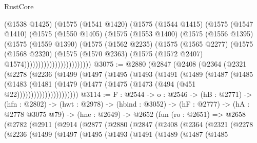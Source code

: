\begin{lexlean}{RustCore}
\begin{coremodule}
                            (@1538 @1425)
                            (@1575
                              (@1541 @1420)
                              (@1575
                                (@1544 @1415)
                                (@1575
                                  (@1547 @1410)
                                  (@1575
                                    (@1550 @1405)
                                    (@1575
                                      (@1553 @1400)
                                      (@1575
                                        (@1556 @1395)
                                        (@1575
                                          (@1559 @1390)
                                          (@1575
                                            (@1562 @2235)
                                            (@1575
                                              (@1565 @2277)
                                              (@1575
                                                (@1568 @2320)
                                                (@1575
                                                  (@1570 @2363)
                                                  (@1575 (@1572 @2407) @1574))))))))))))))))))))))))
@3075 := @2880
    (@2847
      (@2408
        (@2364
          (@2321
            (@2278
              (@2236
                (@1499
                  (@1497
                    (@1495
                      (@1493
                        (@1491
                          (@1489
                            (@1487
                              (@1485
                                (@1483
                                  (@1481
                                    (@1479
                                      (@1477 (@1475 (@1473 (@494 (@451 @22))))))))))))))))))))))
@3114 := {F : @2544} ->
  {o : @2546} ->
  (hB : @2771) ->
  (hfn : @2802) ->
  (hwt : @2978) ->
  (hbind : @3052) ->
  (hF : @2777) ->
  (hA : @2778 @3075 @79) ->
  (hne : @2649) ->
  @2652
    (fun (ro : @2651) =>
    @2658
      (@2782
        (@2911
          (@2914
            (@2877
              (@2880
                (@2847
                  (@2408
                    (@2364
                      (@2321
                        (@2278
                          (@2236
                            (@1499
                              (@1497
                                (@1495
                                  (@1493
                                    (@1491
                                      (@1489
                                        (@1487
                                          (@1485

\end{coremodule}
\end{lexlean}
